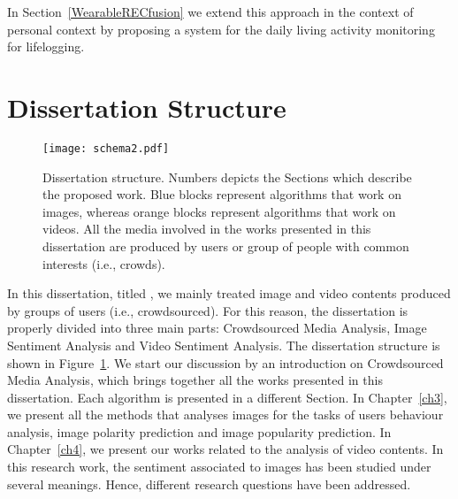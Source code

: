 {In Section~\ref{WearableRECfusion} we extend this approach in the context of personal context by proposing a system for the daily living activity monitoring for lifelogging.

\section{Dissertation Structure}
\begin{figure}[t]
	\centering
	\texttt{[image: schema2.pdf]}
	\caption{Dissertation structure. Numbers depicts the Sections which describe the proposed work. Blue blocks represent algorithms that work on images, whereas orange blocks represent algorithms that work on videos. All the media involved in the works presented in this dissertation are produced by users or group of people with common interests (i.e., crowds).
	}
	\label{figDissertationSchema}
\end{figure}
In this dissertation, titled , we mainly treated image and video contents produced by groups of users (i.e., crowdsourced).
For this reason, the dissertation is properly divided into three main parts: Crowdsourced Media Analysis, Image Sentiment Analysis and Video Sentiment Analysis.
The dissertation structure is shown in Figure~\ref{figDissertationSchema}. We start our discussion by an introduction on Crowdsourced Media Analysis, which brings together all the works presented in this dissertation. Each algorithm is presented in a different Section. In Chapter~\ref{ch3}, we present all the methods that analyses images for the tasks of users behaviour analysis, image polarity prediction and image popularity prediction.
In Chapter~\ref{ch4}, we present our works related to the analysis of video contents.
In this research work, the sentiment associated to images has been studied under several meanings. Hence, different research questions have been addressed. 
}
